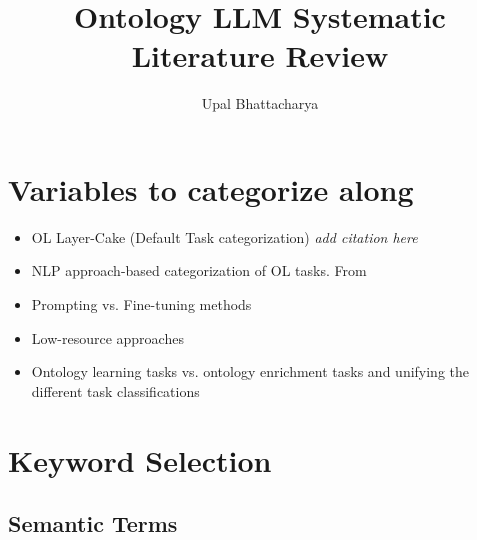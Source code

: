 \documentclass[a4paper,colorinlistoftodos]{article}
\author{Upal Bhattacharya}
\date{}
\title{Ontology LLM Systematic Literature Review}
\begin{document}
\maketitle

\begingroup
    \hypersetup{linkcolor=black}
    \tableofcontents
    \listoftodos
    \pagebreak
\endgroup

\linenumbers

\section{Variables to categorize along}
\label{sec:variables}

\begin{itemize}
\item OL Layer-Cake (Default Task categorization) \textit{add citation here}
\item NLP approach-based categorization of OL tasks.
  From \cite{du2024ShortReviewOntology}
\item Prompting vs. Fine-tuning methods
\item Low-resource approaches
\item Ontology learning tasks vs. ontology enrichment tasks and unifying the
  different task classifications
\end{itemize}

\section{Keyword Selection}
\label{sec:keyword-selection}

\subsection{Semantic Terms}
\label{subsec:semantic-terms}
\end{document}

